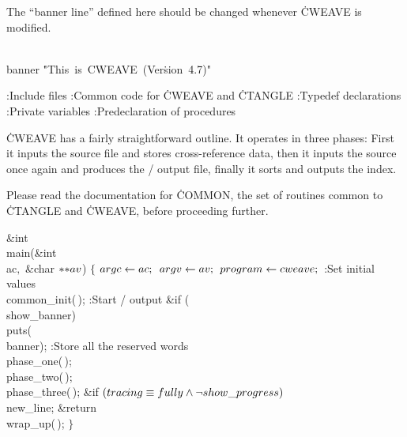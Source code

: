 The ``banner line'' defined here should be changed whenever \.{CWEAVE}
is modified.

\Y\B\4\D\\{banner}\5
\.{"This\ is\ CWEAVE\ (Ver}\)\.{sion\ 4.7)"}\par
\Y\B{}:Include files\X\6
\ATH\6
:Common code for \.{CWEAVE} and \.{CTANGLE}\X\6
:Typedef declarations\X\6
:Private variables\X\6
:Predeclaration of procedures\X\par
\fi

\.{CWEAVE} has a fairly straightforward outline.  It operates in
three phases: First it inputs the source file and stores cross-reference
data, then it inputs the source once again and produces the \TEX/ output
file, finally it sorts and outputs the index.

Please read the documentation for \.{COMMON}, the set of routines common
to \.{CTANGLE} and \.{CWEAVE}, before proceeding further.

\Y\B\1\1\&{int} \\{main}(\&{int} \\{ac}${},{}$\6
\&{char} ${}{*}{*}\\{av}{}$)\2\2\6
${}\{{}$\1\6
${}\\{argc}\leftarrow\\{ac};{}$\6
${}\\{argv}\leftarrow\\{av};{}$\6
${}\\{program}\leftarrow\\{cweave};{}$\6
:Set initial values\X\6
\\{common\_init}(\,);\6
:Start \TEX/ output\X\6
\&{if} (\\{show\_banner})\1\5
\\{puts}(\\{banner});\2\6
:Store all the reserved words\X\6
\\{phase\_one}(\,);\6
\\{phase\_two}(\,);%
\6
\\{phase\_three}(\,);\6
\&{if} ${}(\\{tracing}\equiv\\{fully}\land\lnot\\{show\_progress}){}$\1\5
\\{new\_line};\2\6
\&{return} \\{wrap\_up}(\,);\6
\4${}\}{}$\2\par
\fi

